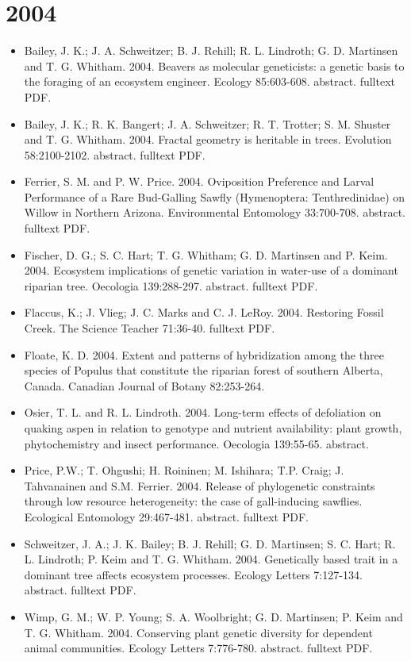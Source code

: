\documentclass[12pt]{article}
\begin{document}
\section{2004}
\begin{itemize}
\item Bailey, J. K.; J. A. Schweitzer; B. J. Rehill; R. L. Lindroth;
G. D. Martinsen and T. G. Whitham. 2004. Beavers as molecular
geneticists: a genetic basis to the foraging of an ecosystem
engineer. Ecology 85:603-608. abstract. fulltext PDF.
 
\item Bailey, J. K.; R. K. Bangert; J. A. Schweitzer; R. T. Trotter;
S. M. Shuster and T. G. Whitham. 2004. Fractal geometry is heritable
in trees. Evolution 58:2100-2102. abstract. fulltext PDF.
 
\item Ferrier, S. M. and P. W. Price. 2004. Oviposition Preference and
Larval Performance of a Rare Bud-Galling Sawfly (Hymenoptera:
Tenthredinidae) on Willow in Northern Arizona. Environmental
Entomology 33:700-708. abstract. fulltext PDF.
 
\item Fischer, D. G.; S. C. Hart; T. G. Whitham; G. D. Martinsen and
P. Keim. 2004. Ecosystem implications of genetic variation in
water-use of a dominant riparian tree. Oecologia
139:288-297. abstract. fulltext PDF.
 
\item Flaccus, K.; J. Vlieg; J. C. Marks and C. J. LeRoy. 2004. Restoring
Fossil Creek. The Science Teacher 71:36-40. fulltext PDF.
 

\item Floate, K. D. 2004. Extent and patterns of hybridization among the
three species of Populus that constitute the riparian forest of
southern Alberta, Canada. Canadian Journal of Botany 82:253-264.
 
\item Osier, T. L. and R. L. Lindroth. 2004. Long-term effects of
defoliation on quaking aspen in relation to genotype and nutrient
availability: plant growth, phytochemistry and insect
performance. Oecologia 139:55-65. abstract.
 
\item Price, P.W.; T. Ohgushi; H. Roininen; M. Ishihara; T.P. Craig;
J. Tahvanainen and S.M. Ferrier. 2004. Release of phylogenetic
constraints through low resource heterogeneity: the case of
gall-inducing sawflies. Ecological Entomology
29:467-481. abstract. fulltext PDF.
 
\item Schweitzer, J. A.; J. K. Bailey; B. J. Rehill; G. D. Martinsen;
S. C. Hart; R. L. Lindroth; P. Keim and
T. G. Whitham. 2004. Genetically based trait in a dominant tree
affects ecosystem processes. Ecology Letters
7:127-134. abstract. fulltext PDF.
 
\item Wimp, G. M.; W. P. Young; S. A. Woolbright; G. D. Martinsen; P. Keim
and T. G. Whitham. 2004. Conserving plant genetic diversity for
dependent animal communities. Ecology Letters
7:776-780. abstract. fulltext PDF.
 
\end{itemize}
\end{document}

